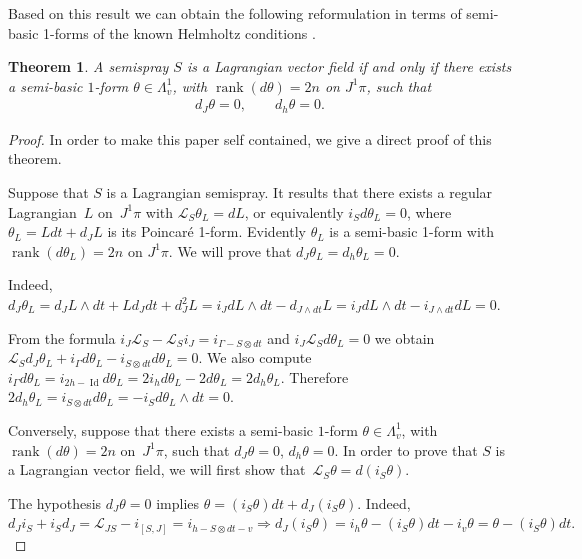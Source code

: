 \documentclass[11pt]{article}
\newtheorem{theorem}{Theorem}
\begin{document}
Based on this result we can obtain the following reformulation in
terms of semi-basic 1-forms of the known Helmholtz conditions \cite[Lemma~4.2, Lemma~4.3,  Theorem~4.5, Theorem~5.1]{B-C-2010}.

\begin{theorem}
A semispray $S$ is a Lagrangian vector field if and only if there
exists a semi-basic $1$-form $\theta\in\Lambda_{v}^{1}$, with $\operatorname{rank}(d\theta)=2n$
on $J^{1}\pi$, such that \begin{gather}
d_{J}\theta=0,\qquad  d_{h}\theta=0.\label{eq:P}
\end{gather}
\end{theorem}
\begin{proof}
In order to make this paper self contained, we give a direct proof
of this theorem.

Suppose that $S$ is a Lagrangian semispray. It results that there
exists a regular Lagrangian~$L$ on~$J^{1}\pi$ with $\mathcal{L}_{S}\theta_{L}=dL$,
or equivalently $i_{S}d\theta_{L}=0$, where $\theta_{L}=Ldt+d_{J}L$
is its Poincar\'e 1-form. Evidently $\theta_{L}$ is a semi-basic 1-form
with $\operatorname{rank}(d\theta_{L})=2n$ on $J^{1}\pi$. We will
prove that $d_{J}\theta_{L}=d_{h}\theta_{L}=0$.

Indeed, $d_{J}\theta_{L}=d_{J}L\wedge dt+Ld_{J}dt+d_{J}^{2}L=i_{J}dL\wedge dt-d_{J\wedge dt}L=i_{J}dL\wedge dt-i_{J\wedge dt}dL=0$.

From the formula $i_{J}\mathcal{L}_{S}-\mathcal{L}_{S}i_{J}=i_{\Gamma-S\otimes dt}$
and $i_{J}\mathcal{L}_{S}d\theta_{L}=0$ we obtain $\mathcal{L}_{S}d_{J}\theta_{L}+i_{\Gamma}d\theta_{L}-i_{S\otimes dt}d\theta_{L}=0$.
We also compute $i_{\Gamma}d\theta_{L}=i_{2h-\operatorname{Id}}d\theta_{L}=2i_{h}d\theta_{L}-2d\theta_{L}=2d_{h}\theta_{L}$.
Therefore $2d_{h}\theta_{L}=i_{S\otimes dt}d\theta_{L}=-i_{S}d\theta_{L}\wedge dt=0$.

Conversely, suppose that there exists a semi-basic $1$-form $\theta\in\Lambda_{v}^{1}$,
with $\operatorname{rank}(d\theta)=2n$ on~$J^{1}\pi$, such that
$d_{J}\theta=0$, $d_{h}\theta=0$. In order to prove that $S$ is
a Lagrangian vector f\/ield, we will f\/irst show that~$\mathcal{L}_{S}\theta=d(i_{S}\theta)$.

The hypothesis $d_{J}\theta=0$ implies $\theta=(i_{S}\theta)dt+d_{J}(i_{S}\theta).$
Indeed, $d_{J}i_{S}+i_{S}d_{J}=\mathcal{L}_{JS}-i_{[S,J]}=i_{h-S\otimes dt-v}\Rightarrow d_{J}(i_{S}\theta)=i_{h}\theta-(i_{S}\theta)dt-i_{v}\theta=\theta-(i_{S}\theta)dt.$


\end{proof}
\end{document}

